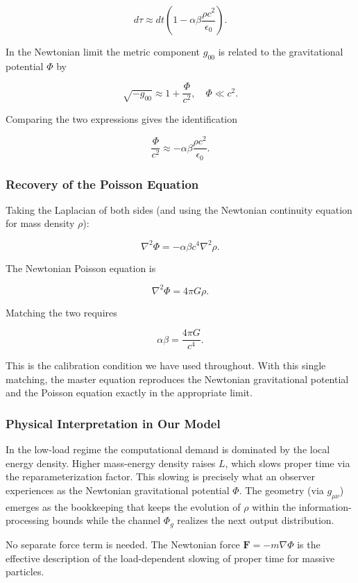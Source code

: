 \documentclass[reprint,amsmath,amssymb,aps,prd,preprintnumbers,superscriptaddress,longbibliography,10pt]{revtex4-2}
\begin{document}
$$
d\tau \approx dt \left(1 - \alpha \beta \frac{\rho c^2}{\epsilon_0}\right).
$$

In the Newtonian limit the metric component $g_{00}$ is related to the gravitational potential $\Phi$ by

$$
\sqrt{-g_{00}} \approx 1 + \frac{\Phi}{c^2}, \quad \Phi \ll c^2.
$$

Comparing the two expressions gives the identification

$$
\frac{\Phi}{c^2} \approx - \alpha \beta \frac{\rho c^2}{\epsilon_0}.
$$

\subsubsection{Recovery of the Poisson Equation}

Taking the Laplacian of both sides (and using the Newtonian continuity equation for mass density $\rho$):

$$
\nabla^2 \Phi = - \alpha \beta c^4 \nabla^2 \rho.
$$

The Newtonian Poisson equation is

$$
\nabla^2 \Phi = 4\pi G \rho.
$$

Matching the two requires

$$
\alpha \beta = \frac{4\pi G}{c^4}.
$$

This is the calibration condition we have used throughout. With this single matching, the master equation reproduces the Newtonian gravitational potential and the Poisson equation exactly in the appropriate limit.

\subsubsection{Physical Interpretation in Our Model}

In the low-load regime the computational demand is dominated by the local energy density. Higher mass-energy density raises $L$, which slows proper time via the reparameterization factor. This slowing is precisely what an observer experiences as the Newtonian gravitational potential $\Phi$. The geometry (via $g_{\mu\nu}$) emerges as the bookkeeping that keeps the evolution of $\rho$ within the information-processing bounds while the channel $\Phi_g$ realizes the next output distribution.

No separate force term is needed. The Newtonian force $ \mathbf{F} = -m \nabla \Phi $ is the effective description of the load-dependent slowing of proper time for massive particles.
\end{document}

